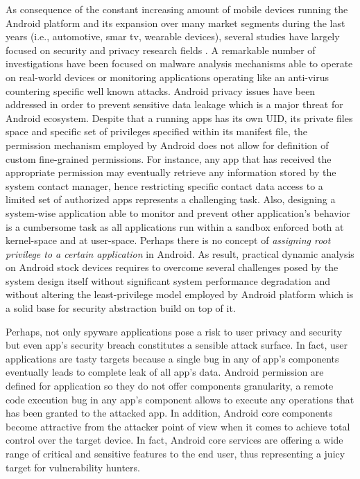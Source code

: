 As consequence of the constant increasing amount of mobile devices running the Android platform and its expansion over many market segments during the last years (i.e., automotive, smar tv, wearable devices), several studies have largely focused on security and privacy research fields \cite{backes2015boxify}.  A remarkable number of investigations have been focused on malware analysis mechanisms  able to operate on real-world devices or monitoring applications operating like an anti-virus countering specific well known attacks. Android privacy issues have been addressed in order to prevent sensitive data leakage which is a major threat for Android ecosystem. Despite that a running apps has its own UID, its private files space and specific set of privileges specified within its manifest file, the permission mechanism employed by Android does not allow for definition of custom fine-grained permissions. For instance, any app that has received the appropriate permission may eventually retrieve any information stored by the system contact manager, hence restricting specific contact data access to a limited set of authorized apps represents a challenging task. Also, designing a system-wise application able to monitor and prevent other application's behavior is a cumbersome task as all applications run within a sandbox enforced both at kernel-space and at user-space. Perhaps there is no concept of \textit{assigning root privilege to a certain application} in Android. As result, practical dynamic analysis on Android stock devices requires to overcome several challenges posed by the system design itself without significant system performance degradation and without altering the least-privilege model employed by Android platform which is a solid base for security abstraction build on top of it.

Perhaps, not only spyware applications pose a risk to user privacy and security but even app's security breach constitutes a sensible attack surface. In fact, user applications are tasty targets because a single bug in any of app's components eventually leads to complete leak of all app's data. Android permission are defined for application so they do not offer components granularity, a remote code execution bug in any app's component allows to execute any operations that has been granted to the attacked app. In addition, Android core components become attractive from the attacker point of view when it comes to achieve total control over the target device. In fact, Android core services are offering a wide range of critical and sensitive features to the end user, thus representing a juicy target for vulnerability hunters.

